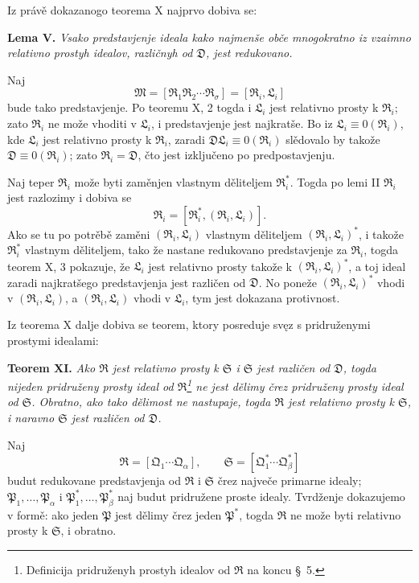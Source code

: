 \documentclass[11pt]{article}
\newcommand{\ideal}[1]{\mathfrak{#1}}
\begin{document}
Iz právě dokazanogo teorema X najprvo dobiva se:

\textbf{Lema V.} \emph{Vsako predstavjenje ideala kako najmenše obče mnogokratno iz vzaimno relativno prostyh idealov, različnyh od \(\ideal D\), jest redukovano.}

Naj
\[
 \ideal M=[\ideal R_1\ideal R_2\cdots\ideal R_\sigma]=[\ideal R_i,\ideal L_i]
\]
bude tako predstavjenje. Po teoremu X, 2 togda i \(\ideal L_i\) jest relativno prosty k \(\ideal R_i\); zato \(\ideal R_i\) ne može vhoditi v \(\ideal L_i\), i predstavjenje jest najkratše. Bo iz \(\ideal L_i\equiv0(\ideal R_i)\), kde \(\ideal L_i\) jest relativno prosty k \(\ideal R_i\), zaradi \(\ideal D\ideal L_i\equiv0(\ideal R_i)\) slědovalo by takože \(\ideal D\equiv0(\ideal R_i)\); zato \(\ideal R_i=\ideal D\), čto jest izključeno po predpostavjenju.

Naj teper \(\ideal R_i\) može byti zaměnjen vlastnym děliteljem \(\ideal R_i^*\). Togda po lemi II \(\ideal R_i\) jest razlozimy i dobiva se
\[
 \ideal R_i=[\ideal R_i^*,(\ideal R_i,\ideal L_i)].
\]
Ako se tu po potrěbě zaměni \((\ideal R_i,\ideal L_i)\) vlastnym děliteljem \((\ideal R_i,\ideal L_i)^*\), i takože \(\ideal R_i^*\) vlastnym děliteljem, tako že nastane redukovano predstavjenje za \(\ideal R_i\), togda teorem X, 3 pokazuje, že \(\ideal L_i\) jest relativno prosty takože k \((\ideal R_i,\ideal L_i)^*\), a toj ideal zaradi najkratšego predstavjenja jest različen od \(\ideal D\). No poneže \((\ideal R_i,\ideal L_i)^*\) vhodi v \((\ideal R_i,\ideal L_i)\), a \((\ideal R_i,\ideal L_i)\) vhodi v \(\ideal L_i\), tym jest dokazana protivnost.

Iz teorema X dalje dobiva se teorem, ktory posreduje svęz s pridruženymi prostymi idealami:

\textbf{Teorem XI.} \emph{Ako \(\ideal R\) jest relativno prosty k \(\ideal S\) i \(\ideal S\) jest različen od \(\ideal D\), togda nijeden pridruženy prosty ideal od \(\ideal R\)\footnote{Definicija pridruženyh prostyh idealov od \(\ideal R\) na koncu \S~5.} ne jest dělimy črez pridruženy prosty ideal od \(\ideal S\). Obratno, ako tako dělimost ne nastupaje, togda \(\ideal R\) jest relativno prosty k \(\ideal S\), i naravno \(\ideal S\) jest različen od \(\ideal D\).}

Naj
\[
 \ideal R=[\ideal Q_1\cdots\ideal Q_\alpha],\qquad
 \ideal S=[\ideal Q_1^*\cdots\ideal Q_\beta^*]
\]
budut redukovane predstavjenja od \(\ideal R\) i \(\ideal S\) črez največe primarne idealy; \(\ideal P_1,\ldots,\ideal P_\alpha\) i \(\ideal P_1^*,\ldots,\ideal P_\beta^*\) naj budut pridružene proste idealy. Tvrdženje dokazujemo v formě: ako jeden \(\ideal P\) jest dělimy črez jeden \(\ideal P^*\), togda \(\ideal R\) ne može byti relativno prosty k \(\ideal S\), i obratno.
\end{document}
